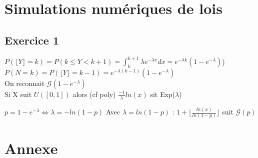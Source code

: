 \documentclass[12pt]{report}
\begin{document}
\chapter*{Simulations numériques de lois}

\section{Exercice 1}

$P(\lfloor Y \rfloor = k) = P(k \leq Y < k+1)= \int_{k}^{k+1} \lambda e^{-\lambda x} dx = e^{-\lambda k} (1-e^{-\lambda})$) 
$P(N = k) = P(\lfloor Y \rfloor = k-1)= e^{-\lambda (k-1)} (1-e^{-\lambda})$\\
On reconnait $\mathcal{G}(1-e^{-\lambda})$\\
Si X suit $U([0,1])$ alors (cf poly) $\frac{-1}{\lambda}ln(x)$ sit Exp($\lambda$)

$p = 1-e^{-\lambda} \Leftrightarrow \lambda = -ln(1-p)$
Avec $\lambda = ln(1-p)$ : $1+ \lfloor \frac{ln(x)}{ln(1-p)} \rfloor$ suit $\mathcal{G}(p)$

\chapter*{Annexe}
\end{document}
